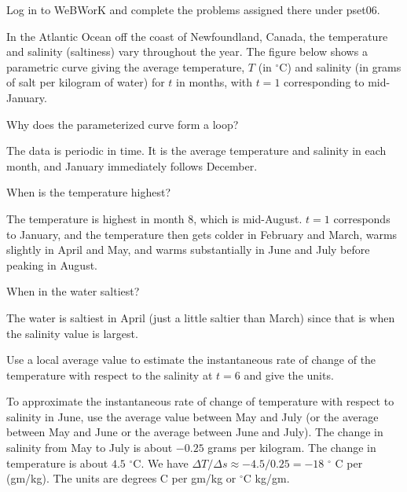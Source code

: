\documentclass[12pt,letterpaper,noanswers]{exam}
\begin{document}
 \pdfpageheight 11in 
  \pdfpagewidth 8.5in

\begin{questions}
\question Log in to WeBWorK and complete the problems assigned there under pset06.




\item In the Atlantic Ocean off the coast of Newfoundland, Canada, the temperature and salinity (saltiness) vary throughout the year.  The figure below shows a parametric curve giving the average temperature, $T$ (in $^\circ$C) and salinity (in grams of salt per kilogram of water) for $t$ in months, with $t=1$ corresponding to mid-January.
\begin{parts}
\item Why does the parameterized curve form a loop?
\begin{solution}
The data is periodic in time.  It is the average temperature and salinity in each month, and January immediately follows December.
\end{solution}
\item When is the temperature highest?
\begin{solution}
The temperature is highest in month $8$, which is mid-August.  $t=1$ corresponds to January, and the temperature then gets colder in February and March, warms slightly in April and May, and warms substantially in June and July before peaking in August.
\end{solution}
\item When in the water saltiest?
\begin{solution}
The water is saltiest in April (just a little saltier than March) since that is when the salinity value is largest.
\end{solution}
\item Use a local average value to estimate the instantaneous rate of change of the temperature with respect to the salinity at $t=6$ and give the units.
\begin{solution}
To approximate the instantaneous rate of change of temperature with respect to salinity in June, use the average value between May and July (or the average between May and June or the average between June and July).  The change in salinity from May to July is about $-0.25$ grams per kilogram.  The change in temperature is about $4.5$ $^\circ$C.  We have $\Delta T/\Delta s \approx -4.5/0.25 = -18$ $^\circ$ C per (gm/kg).  The units are degrees C per gm/kg or $^\circ$C kg/gm.
\end{solution}

\end{parts}
\end{questions}
\end{document}
